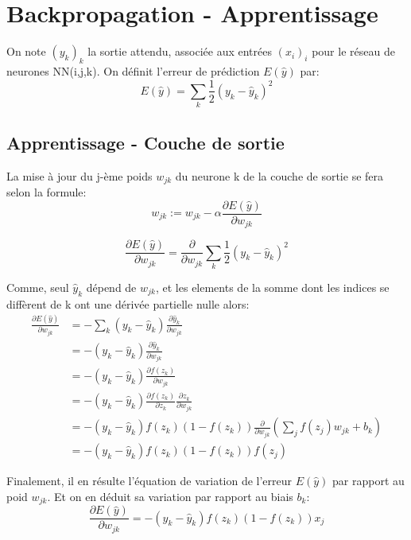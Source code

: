 \documentclass{article}
\begin{document}
\section{Backpropagation - Apprentissage}

On note $(y_k)_k$ la sortie attendu, associée aux entrées $(x_i)_i$ pour le réseau de neurones NN(i,j,k). On définit l'erreur de prédiction $E(\hat{y})$ par:
\begin{equation}
E(\hat{y})=\sum_k{\frac{1}{2}(y_k-\hat{y}_k)^2}
\end{equation}

\subsection{Apprentissage - Couche de sortie}

La mise à jour du j-ème poids $w_{jk}$ du neurone k de la couche de sortie se fera selon la formule: 
\begin{equation}
w_{jk}:=w_{jk}-\alpha\frac{\partial{E(\hat{y})}}{\partial{w_{jk}}}
\end{equation}

\begin{equation}
\frac{\partial{E(\hat{y})}}{\partial{w_{jk}}}=\frac{\partial{}}{\partial{w_{jk}}}\sum_k{\frac{1}{2}(y_k-\hat{y}_k)^2}
\end{equation}

Comme, seul $\hat{y}_k$ dépend de $w_{jk}$, et les elements de la somme dont les indices se diffèrent de k ont une dérivée partielle nulle alors:
\begin{equation}
\begin{split}
\frac{\partial{E(\hat{y})}}{\partial{w_{jk}}}&=-\sum_k{(y_k-\hat{y}_k)\frac{\partial{\hat{y}_k}}{\partial{w_{jk}}}}\\
&=-(y_k-\hat{y}_k)\frac{\partial{\hat{y}_k}}{\partial{w_{jk}}}\\
&=-(y_k-\hat{y}_k)\frac{\partial{f(z_k)}}{\partial{w_{jk}}}\\
&=-(y_k-\hat{y}_k)\frac{\partial{f(z_k)}}{\partial{z_k}}\frac{\partial{z_k}}{\partial{w_{jk}}}\\
&=-(y_k-\hat{y}_k){f(z_k)(1-f(z_k))}\frac{\partial{}}{\partial{w_{jk}}}(\sum_j{f(z_j)w_{jk}}+b_k)\\
&=-(y_k-\hat{y}_k){f(z_k)(1-f(z_k))}f(z_j)
\end{split}
\end{equation}

Finalement, il en résulte l'équation de variation de l'erreur $E(\hat{y})$ par rapport au poid $w_{jk}$. Et on en déduit sa variation par rapport au biais $b_k$:
$$\frac{\partial{E(\hat{y})}}{\partial{w_{jk}}}=-(y_k-\hat{y}_k){f(z_k)(1-f(z_k))}x_j$$
\end{document}
